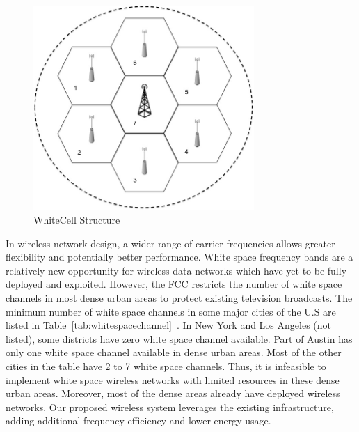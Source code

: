 \begin{figure}
\vspace{-0.0in}
\centering
\includegraphics[width=84mm]{figures/whitecell}
\vspace{-0.1in}
\caption{WhiteCell Structure}
\label{fig:systemmodel}
\vspace{-0.3in}
\end{figure}

In wireless network design, a wider range of carrier frequencies allows greater 
flexibility and potentially better performance.  White space frequency bands are a relatively
new opportunity for wireless data networks which have yet to be fully deployed and exploited.
However, the FCC restricts the number of white space channels in most dense urban areas 
to protect existing television broadcasts. 
The minimum number of white space channels in some major cities of the U.S are listed in 
Table~\ref{tab:whitespacechannel}~\cite{googlespectrum}.
In New York and Los Angeles (not listed), some districts have zero white space channel available.
Part of Austin has only one white space channel available in dense urban areas.
Most of the other cities in the table have 2 to 7 white space channels.
Thus, it is infeasible to implement white space wireless networks 
with limited resources in these dense urban areas.
Moreover, most of the dense areas already have deployed wireless networks. 
Our proposed wireless system leverages the existing infrastructure, adding additional
frequency efficiency and lower energy usage.

